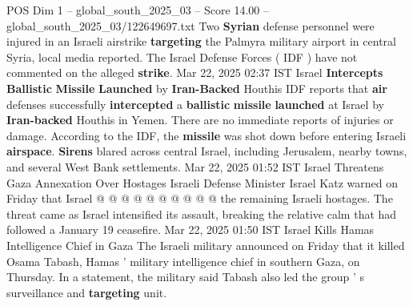 \begin{textsample}{POS Dim 1 – global\_south\_2025\_03 – Score 14.00 – global\_south\_2025\_03/122649697.txt}
Two \textbf{Syrian} defense personnel were injured in an Israeli airstrike \textbf{targeting} the Palmyra military airport in central Syria, local media reported.
The Israel Defense Forces ( IDF ) have not commented on the alleged \textbf{strike}.
Mar 22, 2025 02:37 IST Israel \textbf{Intercepts} \textbf{Ballistic} \textbf{Missile} \textbf{Launched} by \textbf{Iran-Backed} Houthis IDF reports that \textbf{air} defenses successfully \textbf{intercepted} a \textbf{ballistic} \textbf{missile} \textbf{launched} at Israel by \textbf{Iran-backed} Houthis in Yemen.
There are no immediate reports of injuries or damage.
According to the IDF, the \textbf{missile} was shot down before entering Israeli \textbf{airspace}. \textbf{Sirens} blared across central Israel, including Jerusalem, nearby towns, and several West Bank settlements.
Mar 22, 2025 01:52 IST Israel Threatens Gaza Annexation Over Hostages Israeli Defense Minister Israel Katz warned on Friday that Israel @ @ @ @ @ @ @ @ @ @ the remaining Israeli hostages.
The threat came as Israel intensified its assault, breaking the relative calm that had followed a January 19 ceasefire.
Mar 22, 2025 01:50 IST Israel Kills Hamas Intelligence Chief in Gaza The Israeli military announced on Friday that it killed Osama Tabash, Hamas ' military intelligence chief in southern Gaza, on Thursday.
In a statement, the military said Tabash also led the group ' s surveillance and \textbf{targeting} unit.

\end{textsample}
